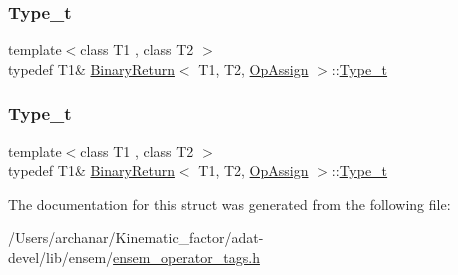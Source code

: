 \mbox{\label{structBinaryReturn_3_01T1_00_01T2_00_01OpAssign_01_4_a53342a562eafe32bec01f522b2e76d49}} 
\subsubsection{\texorpdfstring{Type\_t}{Type\_t}\hspace{0.1cm}{\footnotesize\ttfamily [2/3]}}
{\footnotesize\ttfamily template$<$class T1 , class T2 $>$ \\
typedef T1\& \mbox{\hyperlink{structBinaryReturn}{Binary\+Return}}$<$ T1, T2, \mbox{\hyperlink{structOpAssign}{Op\+Assign}} $>$\+::\mbox{\hyperlink{structBinaryReturn_3_01T1_00_01T2_00_01OpAssign_01_4_a53342a562eafe32bec01f522b2e76d49}{Type\+\_\+t}}}

\mbox{\label{structBinaryReturn_3_01T1_00_01T2_00_01OpAssign_01_4_a53342a562eafe32bec01f522b2e76d49}} 
\subsubsection{\texorpdfstring{Type\_t}{Type\_t}\hspace{0.1cm}{\footnotesize\ttfamily [3/3]}}
{\footnotesize\ttfamily template$<$class T1 , class T2 $>$ \\
typedef T1\& \mbox{\hyperlink{structBinaryReturn}{Binary\+Return}}$<$ T1, T2, \mbox{\hyperlink{structOpAssign}{Op\+Assign}} $>$\+::\mbox{\hyperlink{structBinaryReturn_3_01T1_00_01T2_00_01OpAssign_01_4_a53342a562eafe32bec01f522b2e76d49}{Type\+\_\+t}}}



The documentation for this struct was generated from the following file\+:\begin{DoxyCompactItemize}
\item 
/\+Users/archanar/\+Kinematic\+\_\+factor/adat-\/devel/lib/ensem/\mbox{\hyperlink{adat-devel_2lib_2ensem_2ensem__operator__tags_8h}{ensem\+\_\+operator\+\_\+tags.\+h}}\end{DoxyCompactItemize}
